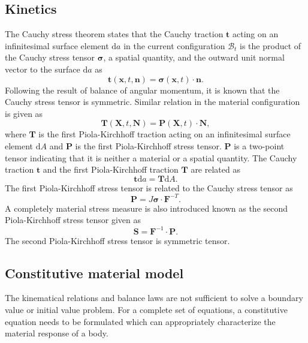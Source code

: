 \documentclass[11pt,a4paper,final]{article}
\begin{document}
\subsection{Kinetics}
The Cauchy stress theorem states that the Cauchy traction $\mathbf{t}$ acting on an infinitesimal surface element $\mathrm{d}a$ in the current configuration $\mathcal{B}_t$ is the product of the Cauchy stress tensor $\bm{\sigma}$, a spatial quantity, and the outward unit normal vector to the surface $\mathrm{d}a$ as 
\begin{equation}
\mathbf{t}(\mathbf{x}, t, \mathbf{n}) = \bm{\sigma}(\mathbf{x}, t) \cdot \mathbf{n}.
\end{equation}
Following the result of balance of angular momentum, it is known that the Cauchy stress tensor is symmetric. Similar relation in the material configuration is given as 
\begin{equation}
\mathbf{T}(\mathbf{X}, t, \mathbf{N}) = \mathbf{P}(\mathbf{X}, t) \cdot \mathbf{N},
\end{equation}
where $\mathbf{T}$ is the first Piola-Kirchhoff traction acting on an infinitesimal surface element $\mathrm{d}A$ and $\mathbf{P}$ is the first Piola-Kirchhoff stress tensor. $\mathbf{P}$ is a two-point tensor indicating that it is neither a material or a spatial quantity. The Cauchy traction $\mathbf{t}$ and the first Piola-Kirchhoff traction $\mathbf{T}$ are related as 
\begin{equation}
\mathbf{t} \mathrm{d}a = \mathbf{T} \mathrm{d}A.
\end{equation}
The first Piola-Kirchhoff stress tensor is related to the Cauchy stress tensor as 
\begin{equation}
\mathbf{P} = J \bm{\sigma} \cdot \mathbf{F}^{-T}.
\end{equation}
A completely material stress measure is also introduced known as the second Piola-Kirchhoff stress tensor given as
\begin{equation}
\mathbf{S} = \mathbf{F}^{-1} \cdot \mathbf{P}.
\end{equation}
The second Piola-Kirchhoff stress tensor is symmetric tensor.

\subsection{Constitutive material model}
\label{sec:const_law}
The kinematical relations and balance laws are not sufficient to solve a boundary value or initial value problem. For a complete set of equations, a constitutive equation needs to be formulated which can appropriately characterize the material response of a body. \par 
\end{document}
